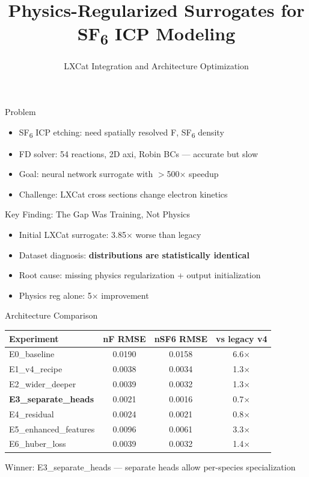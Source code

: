 \documentclass[aspectratio=169]{beamer}
\title{Physics-Regularized Surrogates for SF\textsubscript{6} ICP Modeling}
\subtitle{LXCat Integration and Architecture Optimization}
\date{}
\begin{document}
\begin{frame}
\titlepage
\end{frame}

\begin{frame}{Problem}
\begin{itemize}
  \item SF\textsubscript{6} ICP etching: need spatially resolved F, SF\textsubscript{6} density
  \item FD solver: 54 reactions, 2D axi, Robin BCs --- accurate but slow
  \item Goal: neural network surrogate with $>$500$\times$ speedup
  \item Challenge: LXCat cross sections change electron kinetics
\end{itemize}
\end{frame}

\begin{frame}{Key Finding: The Gap Was Training, Not Physics}
\begin{itemize}
  \item Initial LXCat surrogate: 3.85$\times$ worse than legacy
  \item Dataset diagnosis: \textbf{distributions are statistically identical}
  \item Root cause: missing physics regularization + output initialization
  \item Physics reg alone: 5$\times$ improvement
\end{itemize}
\end{frame}

\begin{frame}{Architecture Comparison}
\begin{table}
\small
\begin{tabular}{lccc}
\toprule
Experiment & nF RMSE & nSF6 RMSE & vs legacy v4 \\
\midrule
E0\_baseline & 0.0190 & 0.0158 & 6.6$\times$ \\
E1\_v4\_recipe & 0.0038 & 0.0034 & 1.3$\times$ \\
E2\_wider\_deeper & 0.0039 & 0.0032 & 1.3$\times$ \\
\textbf{E3\_separate\_heads} & 0.0021 & 0.0016 & 0.7$\times$ \\
E4\_residual & 0.0024 & 0.0021 & 0.8$\times$ \\
E5\_enhanced\_features & 0.0096 & 0.0061 & 3.3$\times$ \\
E6\_huber\_loss & 0.0039 & 0.0032 & 1.4$\times$ \\
\bottomrule
\end{tabular}
\end{table}
Winner: E3\_separate\_heads --- separate heads allow per-species specialization
\end{frame}
\end{document}
